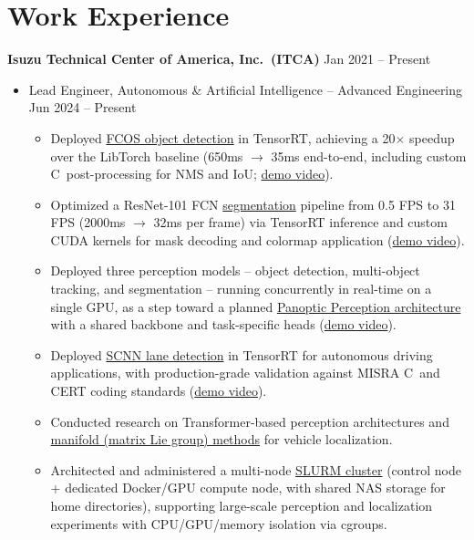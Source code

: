 \documentclass[a4paper,10pt,dvipdfmx]{article}
\def\CC{{C\nolinebreak[4]\hspace{-.05em}\raisebox{.4ex}{\tiny\bf ++}}}
\begin{document}
\section*{Work Experience}
\textbf{Isuzu Technical Center of America, Inc.~(ITCA)} \hfill Jan 2021 -- Present
\begin{itemize}[noitemsep,nolistsep]
  \item[] Lead Engineer, Autonomous \& Artificial Intelligence -- Advanced Engineering \hfill Jun 2024 -- Present
    \begin{itemize}[noitemsep,nolistsep]
      \item Deployed \href{https://chris7462.github.io/blog/2025/09/09/fcos-tensorrt}{FCOS object detection} in TensorRT, achieving a 20$\times$ speedup over the LibTorch baseline (650ms $\to$ 35ms end-to-end, including custom \CC~post-processing for NMS and IoU; \href{https://youtu.be/hCQMdW7kJeU}{demo video}).
      \item Optimized a ResNet-101 FCN \href{https://chris7462.github.io/blog/2025/07/14/fcn-optimization}{segmentation} pipeline from 0.5 FPS to 31 FPS (2000ms $\to$ 32ms per frame) via TensorRT inference and custom CUDA kernels for mask decoding and colormap application (\href{https://youtu.be/VIA2CVCuDEc}{demo video}).
      \item Deployed three perception models -- object detection, multi-object tracking, and segmentation -- running concurrently in real-time on a single GPU, as a step toward a planned \href{https://chris7462.github.io/blog/2025/09/10/panoptic-perception}{Panoptic Perception architecture} with a shared backbone and task-specific heads (\href{https://youtu.be/QRWK-9q1iZU}{demo video}).
      \item Deployed \href{https://chris7462.github.io/blog/2026/01/05/scnn-lane-detection}{SCNN lane detection} in TensorRT for autonomous driving applications, with production-grade validation against MISRA \CC~and CERT coding standards (\href{https://youtu.be/tFX7SLOLkI4}{demo video}).
      \item Conducted research on Transformer-based perception architectures and \href{https://chris7462.github.io/blog/2024/09/28/iekf}{manifold (matrix Lie group) methods} for vehicle localization.
      \item Architected and administered a multi-node \href{https://chris7462.github.io/docs/hpc/admin/slurm/setup}{SLURM cluster} (control node + dedicated Docker/GPU compute node, with shared NAS storage for home directories), supporting large-scale perception and localization experiments with CPU/GPU/memory isolation via cgroups.

\end{itemize}
\end{itemize}
\end{document}
